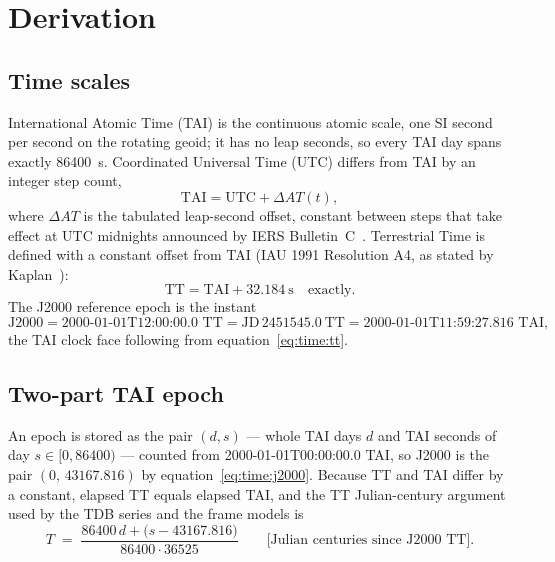 \section{Derivation}
\label{sec:time:derivation}

\subsection{Time scales}

International Atomic Time (TAI) is the continuous atomic scale, one SI
second per second on the rotating geoid; it has no leap seconds, so every
TAI day spans exactly \qty{86400}{\second}. Coordinated Universal Time
(UTC) differs from TAI by an integer step count,
\begin{equation}
  \mathrm{TAI} = \mathrm{UTC} + \Delta AT(t),
  \label{eq:time:utc2tai}
\end{equation}
where $\Delta AT$ is the tabulated leap-second offset, constant between
steps that take effect at UTC midnights announced by IERS
Bulletin~C~\cite{iersbc71}. Terrestrial Time is defined with a constant
offset from TAI (IAU 1991 Resolution A4, as stated by
Kaplan~\cite{kaplan2005}):
\begin{equation}
  \mathrm{TT} = \mathrm{TAI} + \qty{32.184}{\second}
  \quad\text{exactly.}
  \label{eq:time:tt}
\end{equation}
The J2000 reference epoch is the instant
\begin{equation}
  \text{J2000}
  = \text{2000-01-01T12:00:00.0 TT}
  = \mathrm{JD}\,2451545.0\ \mathrm{TT}
  = \text{2000-01-01T11:59:27.816 TAI},
  \label{eq:time:j2000}
\end{equation}
the TAI clock face following from equation~\eqref{eq:time:tt}.

\subsection{Two-part TAI epoch}

An epoch is stored as the pair $(d, s)$ --- whole TAI days $d$ and TAI
seconds of day $s \in [0, 86400)$ --- counted from 2000-01-01T00:00:00.0
TAI, so J2000 is the pair $(0,\, 43167.816)$ by
equation~\eqref{eq:time:j2000}. Because TT and TAI differ by a constant,
elapsed TT equals elapsed TAI, and the TT Julian-century argument used by
the TDB series and the frame models is
\begin{equation}
  T \;=\; \frac{86400\,d + \bigl(s - 43167.816\bigr)}{86400 \cdot 36525}
  \qquad \text{[Julian centuries since J2000 TT]}.
  \label{eq:time:ttcent}
\end{equation}


